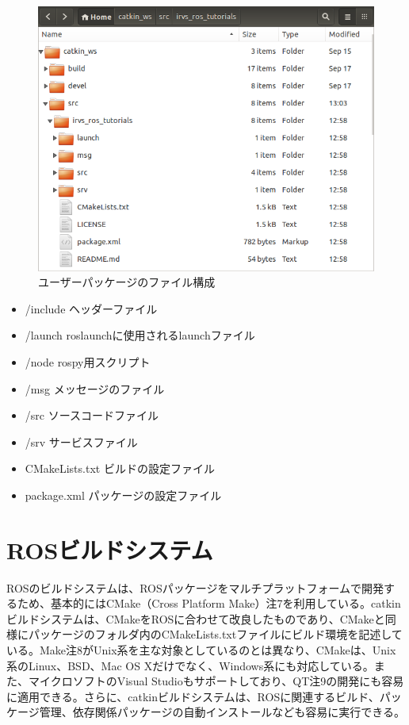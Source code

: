 \begin{figure}[h]
  \centering
  \includegraphics[width=\columnwidth]{pictures/chapter3/pic_03_16.png}
  \caption{ユーザーパッケージのファイル構成}
\end{figure}

\begin{itemize}
\item /include    ヘッダーファイル
\item /launch   roslaunchに使用されるlaunchファイル
\item /node     rospy用スクリプト
\item /msg      メッセージのファイル
\item /src      ソースコードファイル
\item /srv      サービスファイル
\item CMakeLists.txt  ビルドの設定ファイル
\item package.xml   パッケージの設定ファイル
\end{itemize}

\section{ROSビルドシステム}

ROSのビルドシステムは、ROSパッケージをマルチプラットフォームで開発するため、基本的にはCMake（Cross Platform Make）注7を利用している。catkinビルドシステムは、CMakeをROSに合わせて改良したものであり、CMakeと同様にパッケージのフォルダ内のCMakeLists.txtファイルにビルド環境を記述している。Make注8がUnix系を主な対象としているのとは異なり、CMakeは、Unix系のLinux、BSD、Mac OS Xだけでなく、Windows系にも対応している。また、マイクロソフトのVisual Studioもサポートしており、QT注9の開発にも容易に適用できる。さらに、catkinビルドシステムは、ROSに関連するビルド、パッケージ管理、依存関係パッケージの自動インストールなども容易に実行できる。

